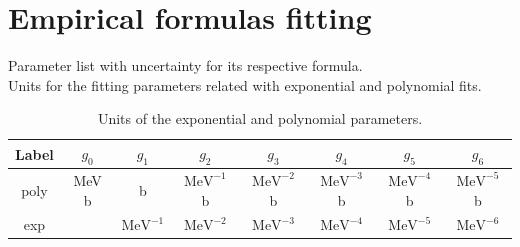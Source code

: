 \documentclass[openany]{book}
\begin{document}
\section{Empirical formulas fitting} \label{sec:empiricalFitting}

Parameter list with uncertainty for its respective formula.  \\

Units for the fitting parameters related with exponential and polynomial fits.

\begin{table}[H]
	\centering
	\begin{tabular}{|c|c|c|c|c|c|c|c|}
		\hline
		Label & $g_0$ & $g_1$  & $g_2$   & $g_3$ &  $g_4$ &  $g_5$ & $g_6$   \\  \hline
		poly &  MeV b & b & $\mathrm{{MeV}^{-1}}$ b &  $\mathrm{{MeV}^{-2}}$ b &  $\mathrm{{MeV}^{-3}}$ b & $\mathrm{{MeV}^{-4}}$ b & $\mathrm{{MeV}^{-5}}$ b  \\  \hline
		exp &  &  $\mathrm{{MeV}^{-1}}$  & $\mathrm{{MeV}^{-2}}$  &  $\mathrm{{MeV}^{-3}}$  &  $\mathrm{{MeV}^{-4}}$  &  $\mathrm{{MeV}^{-5}}$ & $\mathrm{{MeV}^{-6}}$    \\ \hline
	\end{tabular}
	\caption[Units of the exponential and polynomial parameters.]{Units of the exponential and polynomial parameters.}
	\label{table:fitting_empirical_polyexp_units}
\end{table}
\end{document}
